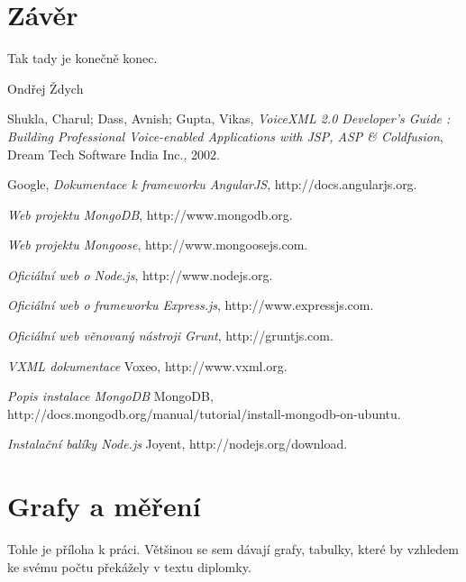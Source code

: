 \documentclass[ing,male,java,dept460]{diploma}						%
\begin{document}
\section{Závěr}
\label{sec:Conclusion}
Tak tady je konečně konec.

\bigskip
\begin{flushright}
Ondřej Ždych
\end{flushright}

\begin{thebibliography}{99}

 Shukla, Charul; Dass, Avnish; Gupta, Vikas,
\textit{VoiceXML 2.0 Developer's Guide : Building Professional Voice-enabled Applications with JSP, ASP & Coldfusion}, Dream Tech Software India Inc., 2002.

 Google,
\textit{Dokumentace k frameworku AngularJS}, http://docs.angularjs.org.

\textit{Web projektu MongoDB}, http://www.mongodb.org.

\textit{Web projektu Mongoose}, http://www.mongoosejs.com.

\textit{Oficiální web o Node.js}, http://www.nodejs.org.

\textit{Oficiální web o frameworku Express.js}, http://www.expressjs.com.

\textit{Oficiální web věnovaný nástroji Grunt}, http://gruntjs.com.

\textit{VXML dokumentace} Voxeo, http://www.vxml.org.

\textit{Popis instalace MongoDB} MongoDB, http://docs.mongodb.org/manual/tutorial/install-mongodb-on-ubuntu.

\textit{Instalační balíky Node.js} Joyent, http://nodejs.org/download.

\end{thebibliography}

\appendix
\section{Grafy a měření}
Tohle je příloha k práci. Většinou se sem dávají grafy, tabulky, které by vzhledem
ke svému počtu překážely v textu diplomky.
\clearpage
\end{document}
